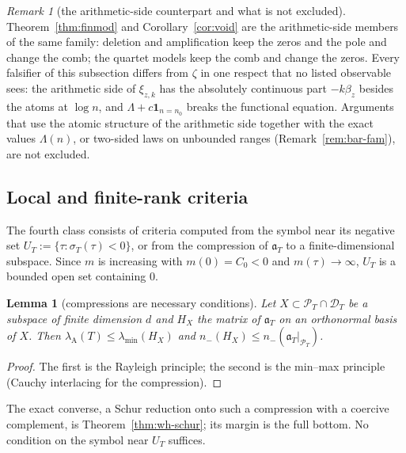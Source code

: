 \documentclass[11pt]{amsart}
\newtheorem{lemma}[theorem]{Lemma}
\theoremstyle{definition}
\theoremstyle{remark}
\newtheorem{remark}[theorem]{Remark}
\newcommand{\PT}{\mathcal P_T}
\newcommand{\lamA}{\lambda_{\mathrm A}(T)}
\newcommand{\sT}{\sigma_T}
\begin{document}
\begin{remark}[the arithmetic-side counterpart and what is not excluded]\label{rem:bar-pat}
Theorem~\ref{thm:finmod} and Corollary~\ref{cor:void} are the arithmetic-side members of the same family: deletion
and amplification keep the zeros and the pole and change the comb; the quartet models keep the comb and change
the zeros. Every falsifier of this subsection differs from $\zeta$ in one respect that no listed observable sees:
the arithmetic side of $\xi_{z,k}$ has the absolutely continuous part $-k\beta_z$ besides the atoms at $\log n$, and
$\Lambda+c\mathbf 1_{n=n_0}$ breaks the functional equation. Arguments that use the atomic structure of the arithmetic
side together with the exact values $\Lambda(n)$, or two-sided laws on unbounded ranges (Remark~\ref{rem:bar-fam}),
are not excluded.
\end{remark}

\subsection{Local and finite-rank criteria}\label{subsec:bar-loc}

The fourth class consists of criteria computed from the symbol near its negative set
$U_T:=\{\tau:\sT(\tau)<0\}$, or from the compression of $\mathfrak a_T$ to a finite-dimensional subspace. Since $m$
is increasing with $m(0)=C_0<0$ and $m(\tau)\to\infty$, $U_T$ is a bounded open set containing $0$.

\begin{lemma}[compressions are necessary conditions]\label{lem:compress}
Let $X\subset\PT\cap\mathcal D_T$ be a subspace of finite dimension $d$ and $H_X$ the matrix of $\mathfrak a_T$ on an
orthonormal basis of $X$. Then $\lamA\le\lambda_{\min}(H_X)$ and $n_-(H_X)\le n_-(\mathfrak a_T|_{\PT})$.
\end{lemma}
\begin{proof}
The first is the Rayleigh principle; the second is the min--max principle (Cauchy interlacing for the compression).
\end{proof}

The exact converse, a Schur reduction onto such a compression with a coercive complement, is
Theorem~\ref{thm:wh-schur}; its margin is the full bottom. No condition on the symbol near $U_T$ suffices.
\end{document}
